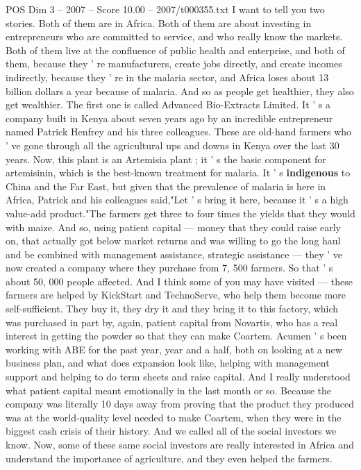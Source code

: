\begin{textsample}{POS Dim 3 – 2007 – Score 10.00 – 2007/t000355.txt}
I want to tell you two stories.
Both of them are in Africa.
Both of them are about investing in entrepreneurs who are committed to service, and who really know the markets.
Both of them live at the confluence of public health and enterprise, and both of them, because they ' re manufacturers, create jobs directly, and create incomes indirectly, because they ' re in the malaria sector, and Africa loses about 13 billion dollars a year because of malaria.
And so as people get healthier, they also get wealthier.
The first one is called Advanced Bio-Extracts Limited.
It ' s a company built in Kenya about seven years ago by an incredible entrepreneur named Patrick Henfrey and his three colleagues.
These are old-hand farmers who ' ve gone through all the agricultural ups and downs in Kenya over the last 30 years.
Now, this plant is an Artemisia plant ; it ' s the basic component for artemisinin, which is the best-known treatment for malaria.
It ' s \textbf{indigenous} to China and the Far East, but given that the prevalence of malaria is here in Africa, Patrick and his colleagues said,"Let ' s bring it here, because it ' s a high value-add product."The farmers get three to four times the yields that they would with maize.
And so, using patient capital — money that they could raise early on, that actually got below market returns and was willing to go the long haul and be combined with management assistance, strategic assistance — they ' ve now created a company where they purchase from 7, 500 farmers.
So that ' s about 50, 000 people affected.
And I think some of you may have visited — these farmers are helped by KickStart and TechnoServe, who help them become more self-sufficient.
They buy it, they dry it and they bring it to this factory, which was purchased in part by, again, patient capital from Novartis, who has a real interest in getting the powder so that they can make Coartem.
Acumen ' s been working with ABE for the past year, year and a half, both on looking at a new business plan, and what does expansion look like, helping with management support and helping to do term sheets and raise capital.
And I really understood what patient capital meant emotionally in the last month or so.
Because the company was literally 10 days away from proving that the product they produced was at the world-quality level needed to make Coartem, when they were in the biggest cash crisis of their history.
And we called all of the social investors we know.
Now, some of these same social investors are really interested in Africa and understand the importance of agriculture, and they even helped the farmers.

\end{textsample}

